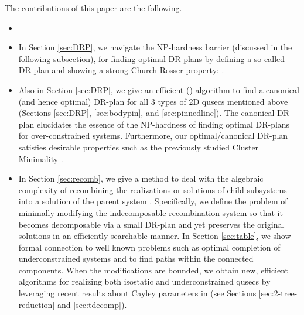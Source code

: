 
The contributions of this paper are the following.
\begin{itemize}
  \item {}

  \item In Section \ref{sec:DRP}, we navigate the NP-hardness barrier (discussed in the following subsection), for finding optimal DR-plans by defining a so-called  DR-plan and showing a strong Church-Rosser property: .

  \item Also in Section \ref{sec:DRP}, we give an efficient (\candrpcomplexity) algorithm to find a canonical (and hence optimal) DR-plan for all 3 types of 2D qusecs mentioned above (Sections \ref{sec:DRP}, \ref{sec:bodypin}, and \ref{sec:pinnedline}). The canonical DR-plan elucidates the essence of the NP-hardness of finding optimal DR-plans for over-constrained systems. Furthermore, our optimal/canonical DR-plan satisfies desirable properties such as the previously studied Cluster Minimality \cite{hoffman2001decompositionI} .

  \item In Section \ref{sec:recomb}, we give a method to deal with the algebraic complexity of recombining the realizations or solutions of child subsystems into a solution of the parent system \cite{sitharam2010optimized,sitharam2006well,sitharam2010reconciling}. Specifically, we define the problem of minimally modifying the indecomposable recombination system so that it becomes decomposable via a small DR-plan and yet preserves the original solutions in an efficiently searchable manner. In Section \ref{sec:table}, we show formal connection to well known problems such as optimal completion of underconstrained systems \cite{joan-arinyo2003transforming,sitharam2005combinatorial,gao2006ctree} and to find paths within the connected components. When the modifications are bounded, we obtain new, efficient algorithms for realizing both isostatic and underconstrained qusecs by leveraging recent results about Cayley parameters in \cite{sitharam2010convex,sitharam2011cayleyI,sitharam2011cayleyII} (see Sections \ref{sec:2-tree-reduction} and \ref{sec:tdecomp}).


\end{itemize}
